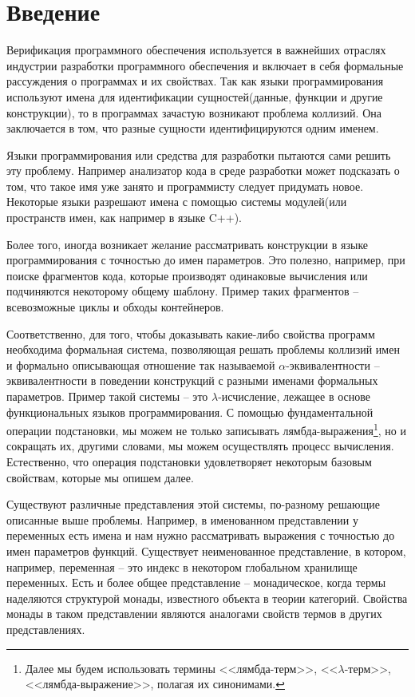 \section*{Введение}

Верификация программного обеспечения используется в важнейших отраслях индустрии разработки программного обеспечения и включает в себя формальные рассуждения о программах и их свойствах. Так как языки программирования используют имена для идентификации сущностей(данные, функции и другие конструкции), то в программах зачастую возникают проблема коллизий. Она заключается в том, что разные сущности идентифицируются одним именем.

Языки программирования или средства для разработки пытаются сами решить эту проблему. Например анализатор кода в среде разработки может подсказать о том, что такое имя уже занято и программисту следует придумать новое. Некоторые языки разрешают имена с помощью системы модулей(или пространств имен, как например в языке C++).

Более того, иногда возникает желание рассматривать конструкции в языке программирования с точностью до имен параметров. Это полезно, например, при поиске фрагментов кода, которые производят одинаковые вычисления или подчиняются некоторому общему шаблону. Пример таких фрагментов -- всевозможные циклы и обходы контейнеров.

Соответственно, для того, чтобы доказывать какие-либо свойства программ необходима формальная система, позволяющая решать проблемы коллизий имен и формально описывающая отношение так называемой $\alpha$-эквивалентности -- эквивалентности в поведении конструкций с разными именами формальных параметров. Пример такой системы -- это $\lambda$-исчисление, лежащее в основе функциональных языков программирования. С помощью фундаментальной операции подстановки, мы можем не только записывать лямбда-выражения\footnote{Далее мы будем использовать термины <<лямбда-терм>>, <<$\lambda$-терм>>, <<лямбда-выражение>>, полагая их синонимами.}, но и сокращать их, другими словами, мы можем осуществлять процесс вычисления. Естественно, что операция подстановки удовлетворяет некоторым базовым свойствам, которые мы опишем далее.

Существуют различные представления этой системы, по-разному решающие описанные выше проблемы. Например, в именованном представлении у переменных есть имена и нам нужно рассматривать выражения с точностью до имен параметров функций. Существует неименованное представление, в котором, например, переменная -- это индекс в некотором глобальном хранилище переменных. Есть и более общее представление -- монадическое, когда термы наделяются структурой монады, известного объекта в теории категорий. Свойства монады в таком представлении являются аналогами свойств термов в других представлениях.

